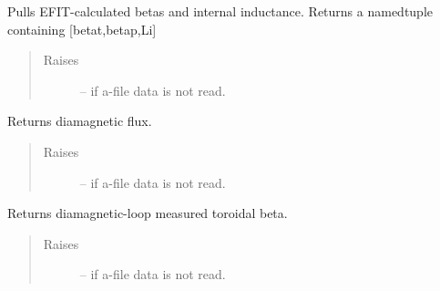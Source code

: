 \documentclass[letterpaper,10pt,english]{sphinxmanual}
\begin{document}
\begin{fulllineitems}
\begin{fulllineitems}
\end{fulllineitems}


\begin{fulllineitems}
\label{eqtools:eqtools.eqdskreader.EqdskReader.getBetas}
Pulls EFIT-calculated betas and internal inductance.
Returns a namedtuple containing {[}betat,betap,Li{]}
\begin{quote}\begin{description}
\item[{Raises }] \leavevmode
{} -- 
if a-file data is not read.

\end{description}\end{quote}

\end{fulllineitems}


\begin{fulllineitems}
\label{eqtools:eqtools.eqdskreader.EqdskReader.getDiamagFlux}
Returns diamagnetic flux.
\begin{quote}\begin{description}
\item[{Raises }] \leavevmode
{} -- 
if a-file data is not read.

\end{description}\end{quote}

\end{fulllineitems}


\begin{fulllineitems}
\label{eqtools:eqtools.eqdskreader.EqdskReader.getDiamagBetaT}
Returns diamagnetic-loop measured toroidal beta.
\begin{quote}\begin{description}
\item[{Raises }] \leavevmode
{} -- 
if a-file data is not read.

\end{description}\end{quote}


\end{fulllineitems}
\end{fulllineitems}
\end{document}
